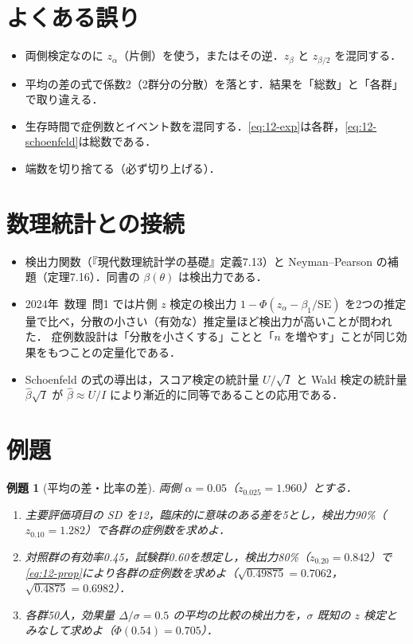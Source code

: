 \documentclass[a4paper,11pt,openany]{ltjsbook}
\newtheorem{reidai}{例題}[chapter]
\newcommand{\kakomonSM}[2]{\mbox{#1年 数理 問#2}}
\newcommand{\SE}{\mathrm{SE}}
\begin{document}
\section{よくある誤り}\label{sec:12-err}
\begin{warnbox}
\begin{itemize}
\item 両側検定なのに $z_\alpha$（片側）を使う，またはその逆．$z_\beta$ と $z_{\beta/2}$ を混同する．
\item 平均の差の式で係数2（2群分の分散）を落とす．結果を「総数」と「各群」で取り違える．
\item 生存時間で症例数とイベント数を混同する．\cref{eq:12-exp}は各群，\cref{eq:12-schoenfeld}は総数である．
\item 端数を切り捨てる（必ず切り上げる）．
\end{itemize}
\end{warnbox}

\section{数理統計との接続}\label{sec:12-link}
\begin{linkbox}
\begin{itemize}
\item 検出力関数（『現代数理統計学の基礎』定義7.13）と Neyman--Pearson の補題（定理7.16）．同書の $\beta(\theta)$ は検出力である．
\item \kakomonSM{2024}{1} では片側 $z$ 検定の検出力 $1-\Phi(z_\alpha-\beta_1/\SE)$ を2つの推定量で比べ，分散の小さい（有効な）推定量ほど検出力が高いことが問われた．
      症例数設計は「分散を小さくする」ことと「$n$ を増やす」ことが同じ効果をもつことの定量化である．
\item Schoenfeld の式の導出は，スコア検定の統計量 $U/\sqrt I$ と Wald 検定の統計量 $\hat\beta\sqrt I$ が $\hat\beta\approx U/I$ により漸近的に同等であることの応用である．
\end{itemize}
\end{linkbox}

\section{例題}\label{sec:12-ex}
\begin{reidai}[平均の差・比率の差]\label{reidai:12-1}
両側 $\alpha=0.05$（$z_{0.025}=1.960$）とする．
\begin{enumerate}[label=(\arabic*)]
\item 主要評価項目の SD を12，臨床的に意味のある差を5とし，検出力90\%（$z_{0.10}=1.282$）で各群の症例数を求めよ．
\item 対照群の有効率0.45，試験群0.60を想定し，検出力80\%（$z_{0.20}=0.842$）で\cref{eq:12-prop}により各群の症例数を求めよ（$\sqrt{0.49875}=0.7062$，$\sqrt{0.4875}=0.6982$）．
\item 各群50人，効果量 $\Delta/\sigma=0.5$ の平均の比較の検出力を，$\sigma$ 既知の $z$ 検定とみなして求めよ（$\Phi(0.54)=0.705$）．
\end{enumerate}
\end{reidai}
\end{document}
